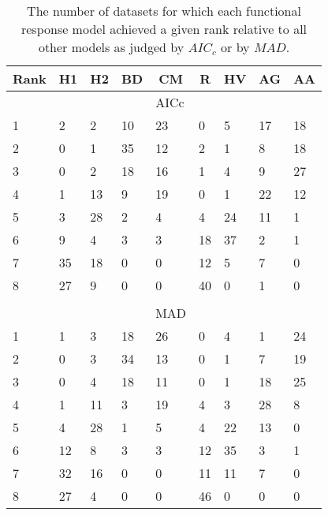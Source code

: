 \begin{table}[!tbp]
\caption{The number of datasets for which each functional response model achieved a given rank relative to all other models as judged by $AIC_c$ or by $MAD$.\label{table:AICc_and_MAD_rankings}} 
\begin{center}
\begin{tabular}{lllllllll}
\hline\hline
\multicolumn{1}{l}{Rank}&\multicolumn{1}{c}{H1}&\multicolumn{1}{c}{H2}&\multicolumn{1}{c}{BD}&\multicolumn{1}{c}{CM}&\multicolumn{1}{c}{R}&\multicolumn{1}{c}{HV}&\multicolumn{1}{c}{AG}&\multicolumn{1}{c}{AA}\tabularnewline
\hline
&&&&AICc&&&&\tabularnewline
1&2&2&10&23&0&5&17&18\tabularnewline
2&0&1&35&12&2&1&8&18\tabularnewline
3&0&2&18&16&1&4&9&27\tabularnewline
4&1&13&9&19&0&1&22&12\tabularnewline
5&3&28&2&4&4&24&11&1\tabularnewline
6&9&4&3&3&18&37&2&1\tabularnewline
7&35&18&0&0&12&5&7&0\tabularnewline
8&27&9&0&0&40&0&1&0\tabularnewline
&&&&&&&&\tabularnewline
&&&&MAD&&&&\tabularnewline
1&1&3&18&26&0&4&1&24\tabularnewline
2&0&3&34&13&0&1&7&19\tabularnewline
3&0&4&18&11&0&1&18&25\tabularnewline
4&1&11&3&19&4&3&28&8\tabularnewline
5&4&28&1&5&4&22&13&0\tabularnewline
6&12&8&3&3&12&35&3&1\tabularnewline
7&32&16&0&0&11&11&7&0\tabularnewline
8&27&4&0&0&46&0&0&0\tabularnewline
\hline
\end{tabular}\end{center}
\end{table}
